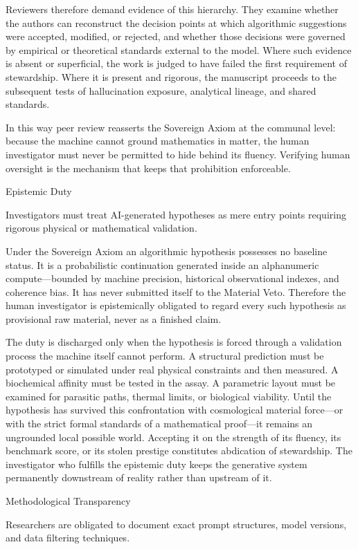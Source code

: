 Reviewers therefore demand evidence of this hierarchy. They examine whether the authors can reconstruct the decision points at which algorithmic suggestions were accepted, modified, or rejected, and whether those decisions were governed by empirical or theoretical standards external to the model. Where such evidence is absent or superficial, the work is judged to have failed the first requirement of stewardship. Where it is present and rigorous, the manuscript proceeds to the subsequent tests of hallucination exposure, analytical lineage, and shared standards.

In this way peer review reasserts the Sovereign Axiom at the communal level: because the machine cannot ground mathematics in matter, the human investigator must never be permitted to hide behind its fluency. Verifying human oversight is the mechanism that keeps that prohibition enforceable.

Epistemic Duty

Investigators must treat AI-generated hypotheses as mere entry points requiring rigorous physical or mathematical validation.

Under the Sovereign Axiom an algorithmic hypothesis possesses no baseline status. It is a probabilistic continuation generated inside an alphanumeric compute—bounded by machine precision, historical observational indexes, and coherence bias. It has never submitted itself to the Material Veto. Therefore the human investigator is epistemically obligated to regard every such hypothesis as provisional raw material, never as a finished claim.

The duty is discharged only when the hypothesis is forced through a validation process the machine itself cannot perform. A structural prediction must be prototyped or simulated under real physical constraints and then measured. A biochemical affinity must be tested in the assay. A parametric layout must be examined for parasitic paths, thermal limits, or biological viability. Until the hypothesis has survived this confrontation with cosmological material force—or with the strict formal standards of a mathematical proof—it remains an ungrounded local possible world. Accepting it on the strength of its fluency, its benchmark score, or its stolen prestige constitutes abdication of stewardship. The investigator who fulfills the epistemic duty keeps the generative system permanently downstream of reality rather than upstream of it.

Methodological Transparency

Researchers are obligated to document exact prompt structures, model versions, and data filtering techniques.

